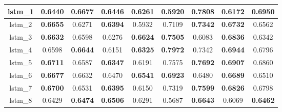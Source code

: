 \begin{table}[hp]
\begin{tabular} {|c|c|c|c|c|c|c|c|c| }
        lstm\_1  & 0.6440                              & \textbf{0.6677}                     & \textbf{0.6446}                     & 0.6261                              & 0.5920                              & \textbf{0.7808}                     & 0.6172                              & \textbf{\cellcolor{green!50}0.6950} \\ \hline
        lstm\_2  & \textbf{0.6655}                     & 0.6271                              & \textbf{0.6394}                     & 0.5932                              & 0.7109                              & \textbf{0.7342}                     & \textbf{0.6732}                     & 0.6562                              \\ \hline
        lstm\_3  & \textbf{0.6632}                     & 0.6598                              & 0.6276                              & \textbf{0.6624}                     & \textbf{0.7505}                     & 0.6083                              & \textbf{0.6836}                     & 0.6342                              \\ \hline
        lstm\_4  & 0.6598                              & \textbf{0.6644}                     & 0.6151                              & \textbf{0.6325}                     & \textbf{0.7972}                     & 0.7342                              & \textbf{\cellcolor{green!50}0.6944} & 0.6796                              \\ \hline
        lstm\_5  & \textbf{\cellcolor{green!50}0.6711} & 0.6587                              & \textbf{0.6347}                     & 0.6191                              & 0.7575                              & \textbf{0.7692}                     & \textbf{0.6907}                     & 0.6860                              \\ \hline
        lstm\_6  & \textbf{0.6677}                     & 0.6632                              & 0.6470                              & \textbf{0.6541}                     & \textbf{0.6923}                     & 0.6480                              & \textbf{0.6689}                     & 0.6510                              \\ \hline
        lstm\_7  & \textbf{0.6700}                     & 0.6531                              & \textbf{0.6395}                     & 0.6150                              & 0.7319                              & \textbf{0.7599}                     & \textbf{0.6826}                     & 0.6798                              \\ \hline
        lstm\_8  & 0.6429                              & \textbf{0.6474}                     & \textbf{0.6506}                     & 0.6291                              & 0.5687                              & \textbf{0.6643}                     & 0.6069                              & \textbf{0.6462}                     \\ \hline

\end{tabular}
\end{table}
